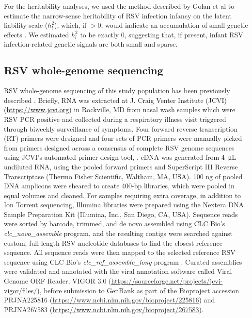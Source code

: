 \documentclass{article} %
\begin{document}
For the heritability analyses, we used the method described by Golan et al to estimate the narrow-sense heritability of RSV infection infancy on the latent liability scale ($h_l^2$), which, if  $> 0$, would indicate an accumulation of small genetic effects
\citep{golan2014measuring}.
We estimated $h_l^2$ to be exactly 0, suggesting that, if present, infant RSV infection-related genetic signals are both small and sparse. 

\subsection{RSV whole-genome sequencing}
RSV whole-genome sequencing of this study population has been previously described 
\cite{schobel_respiratory_2016}.
Briefly, RNA was extracted at J. Craig Venter Institute (JCVI) (\url{https://www.jcvi.org}) in Rockville, MD from nasal wash samples which were RSV PCR positive and collected during a respiratory illness visit triggered through biweekly surveillance of symptoms. 
Four forward reverse transcription (RT) primers were designed and four sets of PCR primers were manually picked from primers designed across a consensus of complete RSV genome sequences using JCVI’s automated primer design tool,
\cite{li_automated_2012}.
cDNA was generated from \SI{4}{\micro\liter}  undiluted RNA, using the pooled forward primers and SuperScript III Reverse Transcriptase (Thermo Fisher Scientific, Waltham, MA, USA). 
100 ng of pooled DNA amplicons were sheared to create 400-bp libraries, which were pooled in equal volumes and cleaned. 
For samples requiring extra coverage, in addition to Ion Torrent sequencing, Illumina libraries were prepared using the Nextera DNA Sample Preparation Kit (Illumina, Inc., San Diego, CA, USA). 
Sequence reads were sorted by barcode, trimmed, and de novo assembled using CLC Bio's \textit{clc\_novo\_assemble} program, and the resulting contigs were searched against custom, full-length RSV nucleotide databases to find the closest reference sequence. 
All sequence reads were then mapped to the selected reference RSV sequence using CLC Bio's \textit{clc\_ref\_assemble\_long} program 
\cite{bioWhite2016}.
Curated assemblies were validated and annotated with the viral annotation software called Viral Genome ORF Reader, VIGOR 3.0 (\url{https://sourceforge.net/projects/jcvi-vigor/files/}), before submission to GenBank as part of the Bioproject accession PRJNA225816 (\url{https://www.ncbi.nlm.nih.gov/bioproject/225816})
\cite{wang_vigor_2012} 
and PRJNA267583 (\url{https://www.ncbi.nlm.nih.gov/bioproject/267583}).
\end{document}
